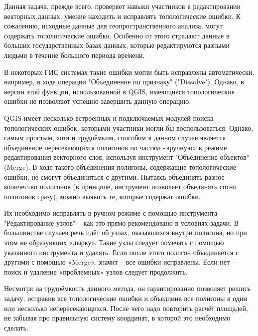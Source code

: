 \explanationSection

Данная задача, прежде всего, проверяет навыки участников в редактировании векторных данных, умение находить и исправлять топологические ошибки. К сожалению, исходные данные для геопространственного анализа, могут содержать топологические ошибки. Особенно от этого страдают данные в больших государственных базах данных, которые редактируются разными людьми в течение большого периода времени.

В некоторых ГИС системах такие ошибки могли быть исправлены автоматически, например, в ходе операции "Объединение по признаку" ("Dissolve"). Однако, в версии этой функции, использованной в QGIS, имеющиеся топологические ошибки не позволяют успешно завершить данную операцию.

QGIS имеет несколько встроенных и подключаемых модулей поиска топологических ошибок, которыми участники могли бы воспользоваться. Однако, самым простым, хотя и трудоёмким, способом в данном случае является объединение пересекающихся полигонов по частям «вручную» в режиме редактирования векторного слоя, используя инструмент "Объединение объектов" (Merge). В ходе такого объединения полигоны, содержащие топологические ошибки, не смогут объединяться с другими. Пытаясь объединять разное количество полигонов (в принципе, инструмент позволяет объединять сотни полигонов сразу), можно выявить те, которые содержат ошибки.

Их необходимо исправлять в ручном режиме с помощью инструмента "Редактирование узлов" – как это прямо рекомендовано в условиях задачи. В большинстве случаев речь идёт об узлах, оказавшихся внутри полигона, но при этом не образующих «дырку». Такие узлы следует помечать с помощью указанного инструмента и удалять. Если после этого полигон объединяется с другими  с помощью «Merge», значит – все ошибки исправлены. Если нет – поиск и удаление «проблемных» узлов следует продолжить.

Несмотря на трудоёмкость данного метода, он гарантированно позволяет решить задачу, исправив все топологические ошибки и объединив все полигоны в один или несколько непересекающихся. После чего надо повторить расчёт площадей, не забывая про правильную систему координат, в которой это необходимо сделать.


